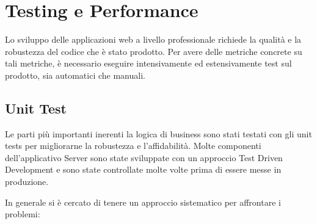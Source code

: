 

\chapter{Testing e Performance}

Lo sviluppo delle applicazioni web a livello professionale richiede la qualità e la robustezza del codice che è stato prodotto. Per avere delle metriche concrete su tali metriche, è necessario eseguire intensivamente ed estensivamente test sul prodotto, sia automatici che manuali.

\section{Unit Test}

Le parti più importanti inerenti la logica di business sono stati testati con gli unit tests per migliorarne la robustezza e l'affidabilità. Molte componenti dell'applicativo Server sono state sviluppate con un approccio Test Driven Development e sono state controllate molte volte prima di essere messe in produzione.

\par In generale si è cercato di tenere un approccio sistematico per affrontare i problemi:

